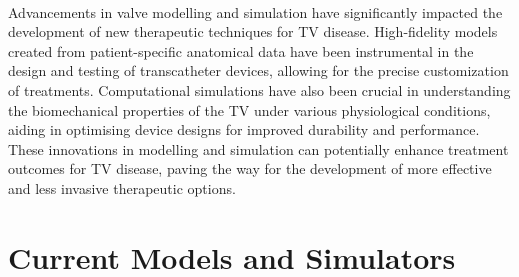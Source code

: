 \\
Advancements in valve modelling and simulation have significantly impacted the development of new therapeutic techniques for \gls{TV} disease. High-fidelity models created from patient-specific anatomical data have been instrumental in the design and testing of transcatheter devices, allowing for the precise customization of treatments. Computational simulations have also been crucial in understanding the biomechanical properties of the \gls{TV} under various physiological conditions, aiding in optimising device designs for improved durability and performance. These innovations in modelling and simulation can potentially enhance treatment outcomes for \gls{TV} disease, paving the way for the development of more effective and less invasive therapeutic options.

\section{Current Models and Simulators}

